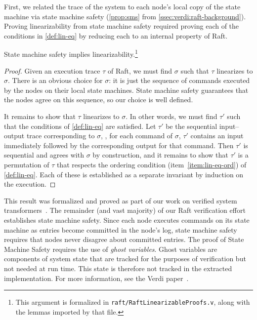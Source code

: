 First, we related the trace of the system
  to each node's local copy of the state machine
  via state machine safety (\cref{prop:sms} from \cref{ssec:verdi:raft-background}).
Proving linearizability from state machine safety required
  proving each of the conditions in \cref{def:lin-eq}
  by reducing each to an internal property of Raft.
\begin{theorem}
  State machine safety implies linearizability.\footnote{This argument is formalized in \texttt{raft/RaftLinearizableProofs.v}, along with the lemmas imported by that file.}
\end{theorem}
\begin{proof}
  Given an execution trace $\tau$ of Raft,
    we must find $\sigma$ such that $\tau$ linearizes to $\sigma$.
  There is an obvious choice for $\sigma$:
    it is just the sequence of commands executed by the nodes
    on their local state machines.
  State machine safety guarantees that the nodes agree on this sequence,
    so our choice is well defined.

  It remains to show that $\tau$ linearizes to $\sigma$.
  In other words, we must find $\tau'$ such that
    the conditions of \cref{def:lin-eq} are satisfied.
  Let $\tau'$ be the sequential input--output trace corresponding to $\sigma$,
    \ie, for each command of $\sigma$,
    $\tau'$ contains an input immediately followed by the corresponding output
    for that command.
  Then $\tau'$ is sequential and agrees with $\sigma$ by construction,
    and it remains to show that $\tau'$ is
    a permutation of $\tau$ that respects the ordering condition
    (item~\ref{item:lin-eq-ord}) of \cref{def:lin-eq}.
  Each of these is established as a separate invariant by induction on the execution.
\end{proof}

This result was formalized and proved as part of our work
  on verified system transformers~\cite{verdi}. 
The remainder (and vast majority) of our Raft verification effort
  establishes state machine safety.
Since each node executes commands on its
  state machine as entries become committed in the node's log,
  state machine safety requires that nodes never disagree
  about committed entries.
The proof of State Machine Safety requires
  the use of \textit{ghost variables}.
Ghost variables are components of system state that are
tracked for the purposes of verification but not
needed at run time. This state is therefore not tracked in the extracted
implementation. For more information, see the Verdi paper~\cite{verdi}. 

